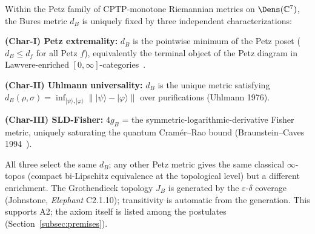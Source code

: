 \begin{theorembox}
Within the Petz family of CPTP-monotone Riemannian metrics on $\Dens(\mathbb{C}^7)$, the
Bures metric $d_B$ is uniquely fixed by three independent characterizations:

\textbf{(Char-I) Petz extremality:} $d_B$ is the pointwise minimum of the Petz poset
($d_B \le d_f$ for all Petz $f$), equivalently the terminal object of the Petz diagram
in Lawvere-enriched $[0,\infty]$-categories~\cite{lawvere1973}.

\textbf{(Char-II) Uhlmann universality:} $d_B$ is the unique metric satisfying
$d_B(\rho,\sigma) = \inf_{|\psi\rangle,|\varphi\rangle}\||\psi\rangle - |\varphi\rangle\|$
over purifications (Uhlmann 1976).

\textbf{(Char-III) SLD-Fisher:} $4g_B$ = the symmetric-logarithmic-derivative Fisher metric,
uniquely saturating the quantum Cram\'{e}r--Rao bound (Braunstein--Caves 1994~\cite{braunstein1994}).

All three select the same $d_B$; any other Petz metric gives the same classical
$\infty$-topos (compact bi-Lipschitz equivalence at the topological level) but a different
enrichment. The Grothendieck topology $J_B$ is generated by the $\varepsilon$-$\delta$
coverage (Johnstone, \emph{Elephant} C2.1.10); transitivity is automatic from the generation.
This supports A2; the axiom itself is listed among the postulates
(Section~\ref{subsec:premises}).
\end{theorembox}

